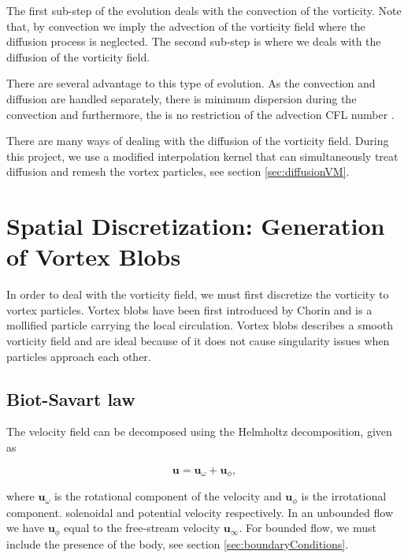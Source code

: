 The first sub-step of the evolution deals with the convection of the vorticity. Note that, by convection we imply the advection of the vorticity field where the diffusion process is neglected. The second sub-step is where we deals with the diffusion of the vorticity field. 

There are several advantage to this type of evolution. As the convection and diffusion are handled separately, there is minimum dispersion during the convection and furthermore, the is no restriction of the advection CFL number \cite{Wee2006}.

There are many ways of dealing with the diffusion of the vorticity field. During this project, we use a modified interpolation kernel \cite{Wee2006} that can simultaneously treat diffusion and remesh the vortex particles, see section \ref{sec:diffusionVM}.

\section{Spatial Discretization: Generation of Vortex Blobs}
\label{sec:spatialDiscretization}

In order to deal with the vorticity field, we must first discretize the vorticity to vortex particles. Vortex blobs have been first introduced by Chorin and is a mollified particle carrying the local circulation. Vortex blobs describes a smooth vorticity field and are ideal because of it does not cause singularity issues when particles approach each other.

\subsection{Biot-Savart law}

The velocity field can be decomposed using the Helmholtz decomposition, given as

	\begin{equation}
	\mathbf{u} = \mathbf{u}_{\omega} + \mathbf{u}_{\phi},
	\label{eq:helmholtz}
	\end{equation}

where $\mathbf{u}_{\omega}$ is the rotational component of the velocity and $\mathbf{u}_{\phi}$ is the irrotational component. solenoidal and potential velocity respectively. In an unbounded flow we have $\mathbf{u}_{\phi}$ equal to the free-stream velocity $\mathbf{u}_{\infty}$. For bounded flow, we must include the presence of the body, see section \ref{sec:boundaryConditions}.
	

